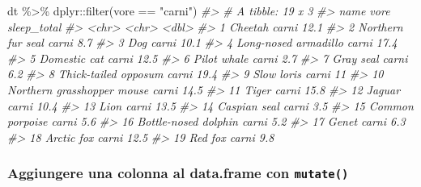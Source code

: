\documentclass[
]{memoir}
\newenvironment{Shaded}{\begin{snugshade}}{\end{snugshade}}
\newcommand{\CommentTok}[1]{\textcolor[rgb]{0.56,0.35,0.01}{\textit{#1}}}
\newcommand{\FunctionTok}[1]{\textcolor[rgb]{0.00,0.00,0.00}{#1}}
\newcommand{\NormalTok}[1]{#1}
\newcommand{\SpecialCharTok}[1]{\textcolor[rgb]{0.00,0.00,0.00}{#1}}
\newcommand{\StringTok}[1]{\textcolor[rgb]{0.31,0.60,0.02}{#1}}
\theoremstyle{definition}
\theoremstyle{definition}
\theoremstyle{definition}
\theoremstyle{definition}
\theoremstyle{remark}
\begin{document}
\begin{Shaded}
\begin{Highlighting}[]
\NormalTok{dt }\SpecialCharTok{\%\textgreater{}\%}
\NormalTok{  dplyr}\SpecialCharTok{::}\FunctionTok{filter}\NormalTok{(vore }\SpecialCharTok{==} \StringTok{"carni"}\NormalTok{)}
\CommentTok{\#\textgreater{} \# A tibble: 19 x 3}
\CommentTok{\#\textgreater{}    name                       vore  sleep\_total}
\CommentTok{\#\textgreater{}    \textless{}chr\textgreater{}                      \textless{}chr\textgreater{}       \textless{}dbl\textgreater{}}
\CommentTok{\#\textgreater{}  1 Cheetah                    carni        12.1}
\CommentTok{\#\textgreater{}  2 Northern fur seal          carni         8.7}
\CommentTok{\#\textgreater{}  3 Dog                        carni        10.1}
\CommentTok{\#\textgreater{}  4 Long{-}nosed armadillo       carni        17.4}
\CommentTok{\#\textgreater{}  5 Domestic cat               carni        12.5}
\CommentTok{\#\textgreater{}  6 Pilot whale                carni         2.7}
\CommentTok{\#\textgreater{}  7 Gray seal                  carni         6.2}
\CommentTok{\#\textgreater{}  8 Thick{-}tailed opposum       carni        19.4}
\CommentTok{\#\textgreater{}  9 Slow loris                 carni        11  }
\CommentTok{\#\textgreater{} 10 Northern grasshopper mouse carni        14.5}
\CommentTok{\#\textgreater{} 11 Tiger                      carni        15.8}
\CommentTok{\#\textgreater{} 12 Jaguar                     carni        10.4}
\CommentTok{\#\textgreater{} 13 Lion                       carni        13.5}
\CommentTok{\#\textgreater{} 14 Caspian seal               carni         3.5}
\CommentTok{\#\textgreater{} 15 Common porpoise            carni         5.6}
\CommentTok{\#\textgreater{} 16 Bottle{-}nosed dolphin       carni         5.2}
\CommentTok{\#\textgreater{} 17 Genet                      carni         6.3}
\CommentTok{\#\textgreater{} 18 Arctic fox                 carni        12.5}
\CommentTok{\#\textgreater{} 19 Red fox                    carni         9.8}
\end{Highlighting}
\end{Shaded}

\hypertarget{aggiungere-una-colonna-al-data.frame-con-mutate}{%
\subsubsection{\texorpdfstring{Aggiungere una colonna al data.frame con \texttt{mutate()}}{Aggiungere una colonna al data.frame con mutate()}}\label{aggiungere-una-colonna-al-data.frame-con-mutate}}
\end{document}
